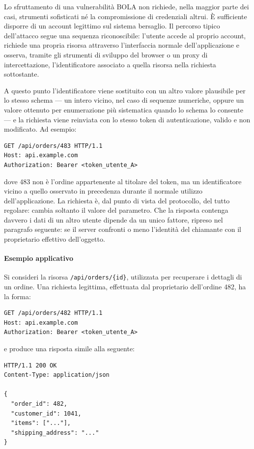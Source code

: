 Lo sfruttamento di una vulnerabilità BOLA non richiede, nella maggior parte dei casi, strumenti
sofisticati né la compromissione di credenziali altrui. È sufficiente disporre di un account
legittimo sul sistema bersaglio. Il percorso tipico dell'attacco segue una sequenza riconoscibile:
l'utente accede al proprio account, richiede una propria risorsa attraverso l'interfaccia normale
dell'applicazione e osserva, tramite gli strumenti di sviluppo del browser o un proxy di
intercettazione, l'identificatore associato a quella risorsa nella richiesta sottostante.

A questo punto l'identificatore viene sostituito con un altro valore plausibile per lo stesso
schema --- un intero vicino, nel caso di sequenze numeriche, oppure un valore ottenuto per
enumerazione più sistematica quando lo schema lo consente --- e la richiesta viene reinviata con lo
stesso token di autenticazione, valido e non modificato. Ad esempio:

\begin{verbatim}
GET /api/orders/483 HTTP/1.1
Host: api.example.com
Authorization: Bearer <token_utente_A>
\end{verbatim}

dove 483 non è l'ordine appartenente al titolare del token, ma un identificatore vicino a quello
osservato in precedenza durante il normale utilizzo dell'applicazione. La richiesta è, dal punto di
vista del protocollo, del tutto regolare: cambia soltanto il valore del parametro. Che la
risposta contenga davvero i dati di un altro utente dipende da un unico fattore, ripreso nel
paragrafo seguente: se il server confronti o meno l'identità del chiamante con il proprietario
effettivo dell'oggetto.

\paragraph{Esempio applicativo}

Si consideri la risorsa \texttt{/api/orders/\{id\}}, utilizzata per recuperare
i dettagli di un ordine. Una richiesta legittima, effettuata dal proprietario dell'ordine 482, ha
la forma:

\begin{verbatim}
GET /api/orders/482 HTTP/1.1
Host: api.example.com
Authorization: Bearer <token_utente_A>
\end{verbatim}

e produce una risposta simile alla seguente:

\begin{verbatim}
HTTP/1.1 200 OK
Content-Type: application/json

{
  "order_id": 482,
  "customer_id": 1041,
  "items": ["..."],
  "shipping_address": "..."
}
\end{verbatim}


